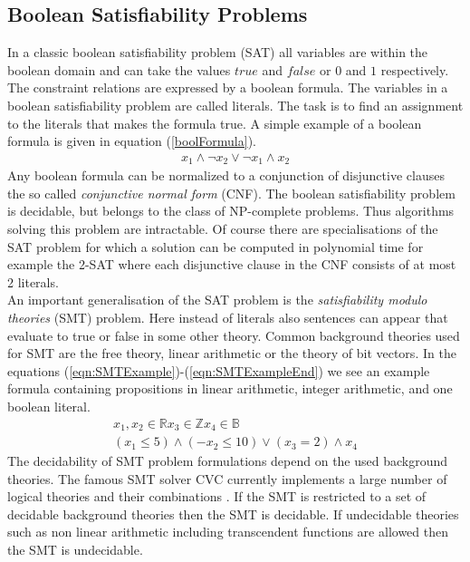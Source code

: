 \subsection{Boolean Satisfiability Problems}
\label{sec:MathBooleanSat}
In a classic boolean satisfiability problem (SAT) all variables are within the boolean domain and can take the values $true$ and $false$ or $0$ and $1$ respectively. The constraint relations are expressed by a boolean formula. The variables in a boolean satisfiability problem are called literals. The task is to find an assignment to the literals that makes the formula true. A simple example of a boolean formula is given in equation (\ref{boolFormula}).
\begin{eqnarray}
x_1 \land \neg x_2  \lor \neg x_1 \land {x_2}
\label{boolFormula}
\end{eqnarray}
Any boolean formula can be normalized to a conjunction of disjunctive clauses the so called \emph{conjunctive normal form} (CNF). The boolean satisfiability problem is decidable, but belongs to the class of NP-complete problems. Thus algorithms solving this problem are intractable. Of course there are specialisations of the SAT problem for which a solution can be computed in polynomial time for example the 2-SAT where each disjunctive clause in the CNF consists of at most 2 literals. \\
An important generalisation of the SAT problem is the \emph{satisfiability modulo theories} (SMT) problem. Here instead of literals also sentences can appear that evaluate to true or false in some other theory. Common background theories used for SMT are the free theory, linear arithmetic or the theory of bit vectors. In the equations (\ref{eqn:SMTExample})-(\ref{eqn:SMTExampleEnd}) we see an example formula containing propositions in linear arithmetic, integer arithmetic, and one boolean literal.
\begin{eqnarray}
\label{eqn:SMTExample}
x_1,x_2\in \mathbb{R} x_3 \in \mathbb{Z} x_4\in \mathbb{B}\\
\label{eqn:SMTExampleEnd}
(x_1\leq 5) \land (-x_2\leq 10) \lor (x_3=2) \land x_4
\end{eqnarray}
The decidability of SMT problem formulations depend on the used background theories. The famous SMT solver CVC currently implements a large number of logical theories and their combinations \cite{cvc}. If the SMT is restricted to a set of decidable background theories then the SMT is decidable. If undecidable theories such as non linear arithmetic including transcendent functions are allowed then the SMT is undecidable.

